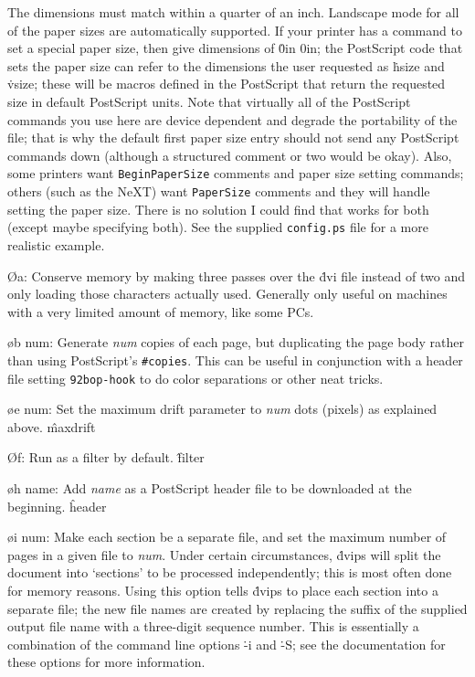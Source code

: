 {The dimensions must match
within a quarter of an inch.  Landscape mode for all of the paper sizes
are automatically supported.  If your printer has a command to set a
special paper size, then give dimensions of \.{0in 0in}; the PostScript
code that sets the paper size can refer to the dimensions the user
requested as \.{\ttbackslash hsize} and \.{\ttbackslash vsize};
these will be macros defined in
the PostScript that return the requested size in default PostScript
units.	Note that virtually all of the PostScript commands you use
here are device dependent and degrade the portability of the file; that
is why the default first paper size entry should not send any PostScript
commands down (although a structured comment or two would be okay).
Also, some printers want {\tt BeginPaperSize} comments and paper size
setting commands; others (such as the NeXT) want {\tt PaperSize} comments
and they will handle setting the paper size.  There is no solution I
could find that works for both (except maybe specifying both).
See the supplied {\tt config.ps} file for a more realistic
example.

\O a:  Conserve memory by making three passes over the \.{dvi} file
instead of two and only loading those characters actually used.
Generally only useful on machines with a very limited amount of
memory, like some PCs.

\o b num: Generate {\it num} copies of each page, but duplicating the
page body rather than using PostScript's {\tt\#copies}.  This can be
useful in conjunction with a header file setting {\tt\char92bop-hook}
to do color separations or other neat tricks.

\o e num:
Set the maximum drift parameter to {\it num} dots (pixels) as explained above.
\^{maxdrift}

\O f:  Run as a filter by default.
\^{filter}

\o h name:
Add {\it name} as a PostScript header file to be downloaded at the beginning.
\^{header}

\o i num:
Make each section be a separate file, and set the maximum number of pages
in a given file to {\it num}.  Under certain circumstances,
\.{dvips} will split the document into `sections' to be processed
independently; this is most often done for memory reasons.  Using this
option tells \.{dvips} to place each section into a separate file; the
new file names are created by replacing the suffix of the supplied output
file name with a three-digit sequence number.
This is essentially a combination of the
command line options \.{-i} and \.{-S}; see the documentation for these
options for more information.

}
